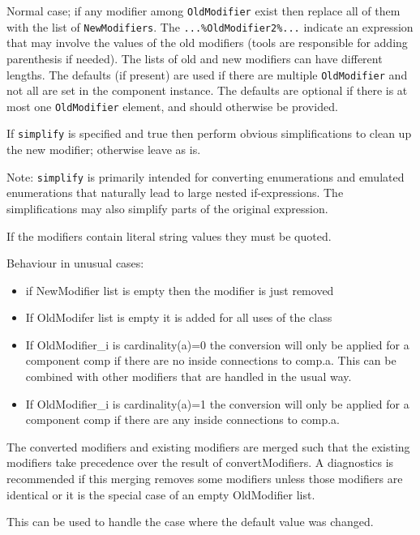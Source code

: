 Normal case; if any modifier among \lstinline!OldModifier! exist then replace all of
them with the list of \lstinline!NewModifiers!. The \lstinline!...%OldModifier2%...! indicate an expression that may
involve the values of the old modifiers (tools are responsible for adding parenthesis if needed).
The lists of old and new modifiers can have different lengths.
The defaults (if present) are used if there
are multiple \lstinline!OldModifier! and not all are set in the component instance.
The defaults are optional if there is at most one \lstinline!OldModifier! element, and should otherwise be provided.

If \lstinline!simplify! is specified and true then perform obvious simplifications
to clean up the new modifier; otherwise leave as is.

\begin{nonnormative}
Note: \lstinline!simplify! is primarily intended for converting enumerations and emulated
enumerations that naturally lead to large nested if-expressions. The
simplifications may also simplify parts of the original expression.
\end{nonnormative}

If the modifiers contain literal string values they must be quoted.

Behaviour in unusual cases:
\begin{itemize}
\item
  if NewModifier list is empty then the modifier is just removed
\item
  If OldModifer list is empty it is added for all uses of the class
\item
  If OldModifier\_i is cardinality(a)=0 the conversion will only be
  applied for a component comp if there are no inside connections to
  comp.a. This can be combined with other modifiers that are handled in
  the usual way.
\item
  If OldModifier\_i is cardinality(a)=1 the conversion will only be
  applied for a component comp if there are any inside connections to
  comp.a.
\end{itemize}

The converted modifiers and existing modifiers are merged such that the existing modifiers take precedence over the result of convertModifiers.
A diagnostics is recommended if this merging removes some modifiers unless those modifiers are identical or it is the special case of an empty OldModifier list.
\begin{nonnormative}
This can be used to handle the case where the default value was changed.
\end{nonnormative}

